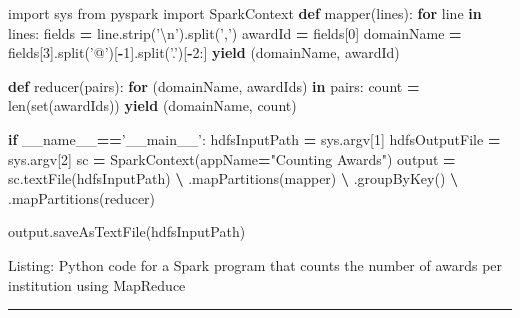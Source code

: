\documentclass[]{krantz}
\newenvironment{Shaded}{\begin{snugshade}}{\end{snugshade}}
\newcommand{\KeywordTok}[1]{\textcolor[rgb]{0.13,0.29,0.53}{\textbf{#1}}}
\newcommand{\DecValTok}[1]{\textcolor[rgb]{0.00,0.00,0.81}{#1}}
\newcommand{\CharTok}[1]{\textcolor[rgb]{0.31,0.60,0.02}{#1}}
\newcommand{\StringTok}[1]{\textcolor[rgb]{0.31,0.60,0.02}{#1}}
\newcommand{\ImportTok}[1]{#1}
\newcommand{\VariableTok}[1]{\textcolor[rgb]{0.00,0.00,0.00}{#1}}
\newcommand{\ControlFlowTok}[1]{\textcolor[rgb]{0.13,0.29,0.53}{\textbf{#1}}}
\newcommand{\OperatorTok}[1]{\textcolor[rgb]{0.81,0.36,0.00}{\textbf{#1}}}
\newcommand{\BuiltInTok}[1]{#1}
\newcommand{\NormalTok}[1]{#1}
\begin{document}
\begin{Shaded}
\begin{Highlighting}[]
\ImportTok{import}\NormalTok{ sys}
\ImportTok{from}\NormalTok{ pyspark }\ImportTok{import}\NormalTok{ SparkContext}
\KeywordTok{def}\NormalTok{ mapper(lines):}
    \ControlFlowTok{for}\NormalTok{ line }\KeywordTok{in}\NormalTok{ lines:}
\NormalTok{        fields     }\OperatorTok{=}\NormalTok{ line.strip(}\StringTok{'}\CharTok{\textbackslash{}n}\StringTok{'}\NormalTok{).split(}\StringTok{','}\NormalTok{)}
\NormalTok{        awardId    }\OperatorTok{=}\NormalTok{ fields[}\DecValTok{0}\NormalTok{]}
\NormalTok{        domainName }\OperatorTok{=}\NormalTok{ fields[}\DecValTok{3}\NormalTok{].split(}\StringTok{'@'}\NormalTok{)[}\OperatorTok{-}\DecValTok{1}\NormalTok{].split(}\StringTok{'.'}\NormalTok{)[}\OperatorTok{-}\DecValTok{2}\NormalTok{:]}
        \ControlFlowTok{yield}\NormalTok{ (domainName, awardId)}

\KeywordTok{def}\NormalTok{ reducer(pairs):}
    \ControlFlowTok{for}\NormalTok{ (domainName, awardIds) }\KeywordTok{in}\NormalTok{ pairs:}
\NormalTok{        count }\OperatorTok{=} \BuiltInTok{len}\NormalTok{(}\BuiltInTok{set}\NormalTok{(awardIds))}
        \ControlFlowTok{yield}\NormalTok{ (domainName, count)}

\ControlFlowTok{if} \VariableTok{__name__}\OperatorTok{==}\StringTok{'__main__'}\NormalTok{:}
\NormalTok{    hdfsInputPath  }\OperatorTok{=}\NormalTok{ sys.argv[}\DecValTok{1}\NormalTok{]}
\NormalTok{    hdfsOutputFile }\OperatorTok{=}\NormalTok{  sys.argv[}\DecValTok{2}\NormalTok{]}
\NormalTok{    sc }\OperatorTok{=}\NormalTok{ SparkContext(appName}\OperatorTok{=}\StringTok{"Counting Awards"}\NormalTok{)}
\NormalTok{    output }\OperatorTok{=}\NormalTok{ sc.textFile(hdfsInputPath) }\OperatorTok{\textbackslash{}}
\NormalTok{        .mapPartitions(mapper) }\OperatorTok{\textbackslash{}}
\NormalTok{        .groupByKey() }\OperatorTok{\textbackslash{}}
\NormalTok{        .mapPartitions(reducer)}

\NormalTok{    output.saveAsTextFile(hdfsInputPath)}
\end{Highlighting}
\end{Shaded}

Listing: Python code for a Spark program that counts the number of
awards per institution using MapReduce

\begin{center}\rule{0.5\linewidth}{\linethickness}\end{center}
\end{document}
